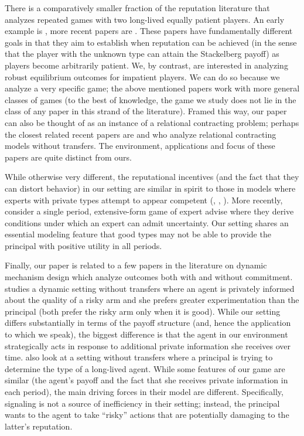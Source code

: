 \documentclass[11pt,reqno]{amsart}
\begin{document}
There is a comparatively smaller fraction of the reputation literature that analyzes repeated games with two long-lived equally patient players. An early example is \cite{cripps1997}, more recent papers are \cite{atakan2012,atakan2013}. These papers have fundamentally different goals in that they aim to establish when reputation can be achieved (in the sense that the player with the unknown type can attain the Stackelberg payoff) as players become arbitrarily patient. We, by contrast, are interested in analyzing robust equilibrium outcomes for impatient players. We can do so because we analyze a very specific game; the above mentioned papers work with more general classes of games (to the best of knowledge, the game we study does not lie in the class of any paper in this strand of the literature). Framed this way, our paper can also be thought of as an instance of a relational contracting problem; perhaps the closest related recent papers are \cite{li2017} and \cite{mitchell2017} who analyze relational contracting models without transfers. The environment, applications and focus of these papers are quite distinct from ours.

While otherwise very different, the reputational incentives (and the fact that they can distort behavior) in our setting are similar in spirit to those in models where experts with private types attempt to appear competent (\cite{prendergast1996}, \cite{morris2001}, \cite{ottaviani2006reputational}). More recently, \citet{backus2018} consider a single period, extensive-form game of expert advise where they derive conditions under which an expert can admit uncertainty. Our setting shares an essential modeling feature that good types may not be able to provide the principal with positive utility in all periods.

Finally, our paper is related to a few papers in the literature on dynamic mechanism design which analyze outcomes both with and without commitment. \cite{guo2016} studies a dynamic setting without transfers where an agent is privately informed about the quality of a risky arm and she prefers greater experimentation than the principal (both prefer the risky arm only when it is good). While our setting differs substantially in terms of the payoff structure (and, hence the application to which we speak), the biggest difference is that the agent in our environment strategically acts in response to additional private information she receives over time. \cite{aghion2016} also look at a setting without transfers where a principal is trying to determine the type of a long-lived agent. While some features of our game are similar (the agent's payoff and the fact that she receives private information in each period), the main driving forces in their model are different. Specifically, signaling is not a source  of inefficiency in their setting; instead, the principal wants to the agent to take ``risky'' actions that are potentially damaging to the latter's reputation.

\newpage



\end{document}
